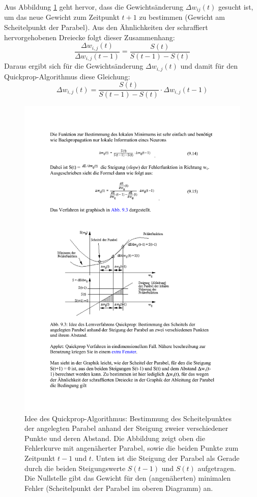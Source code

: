 Aus Abbildung \ref{fig:ch03_quickprop} geht hervor, dass die Gewichtsänderung $\Delta w_{ij}(t)$ gesucht ist, um das neue Gewicht zum Zeitpunkt $t+1$ zu bestimmen (Gewicht am Scheitelpunkt der Parabel). Aus den Ähnlichkeiten der schraffiert hervorgehobenen Dreiecke folgt dieser Zusammenhang:
\[
	\frac{\Delta w_{i,j}(t)}{\Delta w_{i,j}(t-1)} = 
		\frac{S(t)}{S(t-1) - S(t)}
\]
Daraus ergibt sich für die Gewichtsänderung $\Delta w_{i,j}(t)$ und damit für den Quickprop-Algorithmus diese Gleichung:
\[
	\Delta w_{i,j}(t) = 
		\frac{S(t)}{S(t-1) - S(t)} \cdot \Delta w_{i,j}(t-1)
\]

\begin{figure}[ht!] \centering 
	\includegraphics[width=\linewidth]{figures/ch03_quickprop.pdf}
	\caption{Idee des Quickprop-Algorithmus: Bestimmung des Scheitelpunktes der angelegten Parabel anhand der Steigung zweier verschiedener Punkte und deren Abstand. Die Abbildung zeigt oben die Fehlerkurve mit angenäherter Parabel, sowie die beiden Punkte zum Zeitpunkt $t-1$ und $t$. Unten ist die Steigung der Parabel als Gerade durch die beiden Steigungswerte $S(t-1)$ und $S(t)$ aufgetragen. Die Nullstelle gibt das Gewicht für den (angenäherten) minimalen Fehler (Scheitelpunkt der Parabel im oberen Diagramm) an.}
	\label{fig:ch03_quickprop}
\end{figure}



